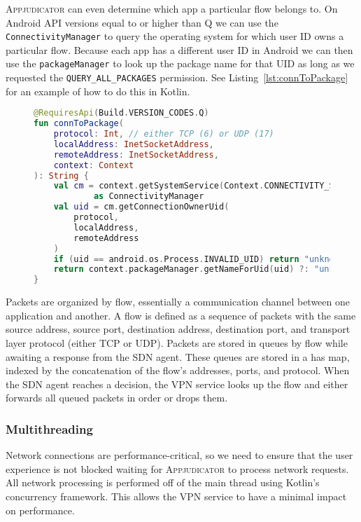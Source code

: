 \textsc{Appjudicator} can even determine which app a particular flow belongs to.
On Android API versions equal to or higher than Q we can use the
\texttt{ConnectivityManager} to query the operating system for which user ID
owns a particular flow. Because each app has a different user ID in Android we
can then use the \texttt{packageManager} to look up the package name for that
UID as long as we requested the \texttt{QUERY\_ALL\_PACKAGES} permission. See
Listing~\ref{lst:connToPackage} for an example of how to do this in Kotlin.

\begin{figure}[h]
\begin{lstlisting}[caption={Getting the package that owns a connection.},
	label={lst:connToPackage}, language=Kotlin]
@RequiresApi(Build.VERSION_CODES.Q)
fun connToPackage(
    protocol: Int, // either TCP (6) or UDP (17)
    localAddress: InetSocketAddress,
    remoteAddress: InetSocketAddress,
    context: Context
): String {
	val cm = context.getSystemService(Context.CONNECTIVITY_SERVICE)
			as ConnectivityManager
	val uid = cm.getConnectionOwnerUid(
		protocol,
		localAddress,
		remoteAddress
	)
	if (uid == android.os.Process.INVALID_UID) return "unknown"
	return context.packageManager.getNameForUid(uid) ?: "unknown"
}
\end{lstlisting}
\end{figure}

Packets are organized by flow, essentially a communication channel between one
application and another. A flow is defined as a sequence of packets with the
same source address, source port, destination address, destination port, and
transport layer protocol (either TCP or UDP). Packets are stored in queues by
flow while awaiting a response from the SDN agent. These queues are stored in a
has map, indexed by the concatenation of the flow's addresses, ports, and
protocol. When the SDN agent reaches a decision, the VPN service looks up the
flow and either forwards all queued packets in order or drops them.

\subsubsection{Multithreading}
\label{sec:multithreading}

Network connections are performance-critical, so we need to ensure that the user
experience is not blocked waiting for \textsc{Appjudicator} to process network
requests. All network processing is performed off of the main thread using
Kotlin's concurrency framework. This allows the VPN service to have a minimal
impact on performance.

